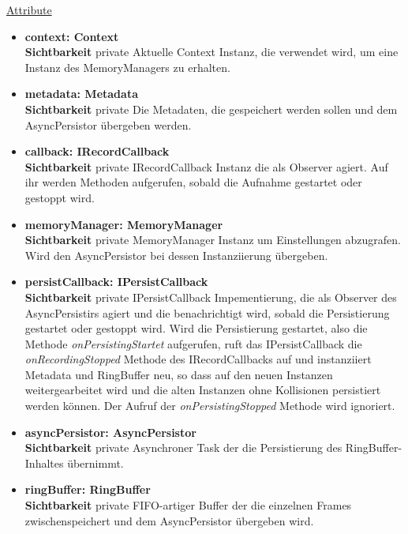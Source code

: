 \underline{Attribute}
\begin{itemize}
\itemsep0pt
\item \textbf{context: Context} \hfill\\ 
\textbf{Sichtbarkeit} private \newline
Aktuelle Context Instanz, die verwendet wird, um eine Instanz des MemoryManagers zu erhalten.

\item \textbf{metadata: Metadata} \hfill\\ 
\textbf{Sichtbarkeit} private \newline
Die Metadaten, die gespeichert werden sollen und dem AsyncPersistor übergeben werden.

\item \textbf{callback: IRecordCallback} \hfill\\ 
\textbf{Sichtbarkeit} private \newline
IRecordCallback Instanz die als Observer agiert. Auf ihr werden Methoden aufgerufen, sobald die Aufnahme gestartet oder gestoppt wird.

\item \textbf{memoryManager: MemoryManager} \hfill\\ 
\textbf{Sichtbarkeit} private \newline
MemoryManager Instanz um Einstellungen abzugrafen. Wird den AsyncPersistor bei dessen Instanziierung übergeben.

\item \textbf{persistCallback: IPersistCallback} \hfill\\ 
\textbf{Sichtbarkeit} private \newline
IPersistCallback Impementierung, die als Observer des AsyncPersistirs agiert und die benachrichtigt wird, sobald die Persistierung gestartet oder gestoppt wird. Wird die Persistierung gestartet, also die Methode \textit{onPersistingStartet} aufgerufen, ruft das IPersistCallback die \textit{onRecordingStopped} Methode des IRecordCallbacks auf und instanziiert Metadata und RingBuffer neu, so dass auf den neuen Instanzen weitergearbeitet wird und die alten Instanzen ohne Kollisionen persistiert werden können. Der Aufruf der \textit{onPersistingStopped} Methode wird ignoriert.

\item \textbf{asyncPersistor: AsyncPersistor} \hfill\\ 
\textbf{Sichtbarkeit} private \newline
Asynchroner Task der die Persistierung des RingBuffer-Inhaltes übernimmt.

\item \textbf{ringBuffer: RingBuffer} \hfill\\ 
\textbf{Sichtbarkeit} private \newline
FIFO-artiger Buffer der die einzelnen Frames zwischenspeichert und dem AsyncPersistor übergeben wird.

\end{itemize}

